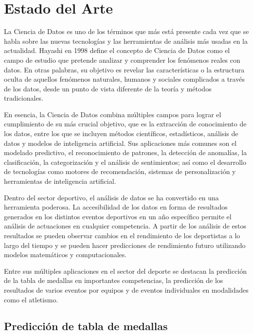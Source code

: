\chapter{Estado del Arte}\label{chapter:state-of-the-art}

La Ciencia de Datos es uno de los términos que más está presente cada vez que se habla sobre las nuevas tecnologías y las herramientas de análisis más usadas en la actualidad. Hayashi en 1998 \cite{hayashi1998} define el concepto de Ciencia de Datos como el campo de estudio que pretende analizar y comprender los fenómenos reales con datos. En otras palabras, su objetivo es revelar las características o la estructura oculta de aquellos fenómenos naturales, humanos y sociales complicados a través de los datos, desde un punto de vista diferente de la teoría y métodos tradicionales. 

En esencia, la Ciencia de Datos combina múltiples campos para lograr el cumplimiento de su más crucial objetivo, que es la extracción de conocimiento de los datos, entre los que se incluyen métodos científicos, estadísticos, análisis de datos y modelos de inteligencia artificial. Sus aplicaciones más comunes son el modelado predictivo, el reconocimiento de patrones, la detección de anomalías, la clasificación, la categorización y el análisis de sentimientos; así como el desarrollo de tecnologías como motores de recomendación, sistemas de personalización y herramientas de inteligencia artificial.

Dentro del sector deportivo, el análisis de datos se ha convertido en una herramienta poderosa. La accesibilidad de los datos en forma de resultados generados en los distintos eventos deportivos en un año específico permite el análisis de actuaciones en cualquier competencia. A partir de los análisis de estos resultados se pueden observar cambios en el rendimiento de los deportistas a lo largo del tiempo y se pueden hacer predicciones de rendimiento futuro utilizando modelos matemáticos y computacionales.  

Entre sus múltiples aplicaciones en el sector del deporte se destacan la predicción de la tabla de medallas en importantes competencias, la predicción de los resultados de varios eventos por equipos y de eventos individuales en modalidades como el atletismo.

\section{Predicción de tabla de medallas}

